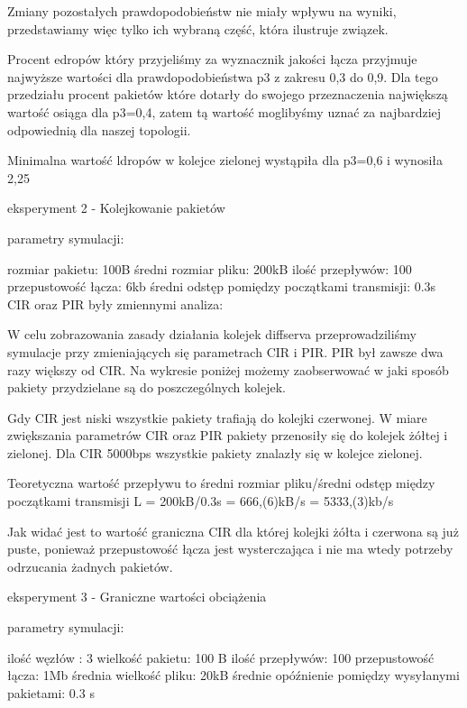 \documentclass[a4paper]{article}
\begin{document}
Zmiany pozostałych prawdopodobieństw nie miały wpływu na wyniki, przedstawiamy więc tylko ich wybraną część, która ilustruje związek.





Procent edropów który przyjeliśmy za wyznacznik jakości łącza przyjmuje najwyższe wartości dla prawdopodobieństwa p3 z zakresu 0,3 do 0,9. Dla tego przedziału procent pakietów które dotarły do swojego przeznaczenia największą wartość osiąga dla p3=0,4, zatem tą wartość moglibyśmy uznać za najbardziej odpowiednią dla naszej topologii. 

Minimalna wartość ldropów w kolejce zielonej wystąpiła dla p3=0,6 i wynosiła 2,25%

eksperyment 2 - Kolejkowanie pakietów

parametry symulacji:

rozmiar pakietu: 100B
średni rozmiar pliku: 200kB
ilość przepływów: 100
przepustowość łącza: 6kb
średni odstęp pomiędzy początkami transmisji: 0.3s
CIR oraz PIR były zmiennymi
analiza:

W celu zobrazowania zasady działania kolejek diffserva przeprowadziliśmy symulacje przy zmieniających się parametrach CIR i PIR. PIR był zawsze dwa razy większy od CIR.
Na wykresie poniżej możemy zaobserwować w jaki sposób pakiety przydzielane są do poszczególnych kolejek.






Gdy CIR jest niski wszystkie pakiety trafiają do kolejki czerwonej. W miare zwiększania parametrów CIR oraz PIR pakiety przenosiły się do kolejek żółtej i zielonej. Dla CIR 5000bps wszystkie pakiety znalazły się w kolejce zielonej.

Teoretyczna wartość przepływu to średni rozmiar pliku/średni odstęp między początkami transmisji
L = 200kB/0.3s = 666,(6)kB/s = 5333,(3)kb/s

Jak widać jest to wartość graniczna CIR dla której kolejki żółta i czerwona są już puste, ponieważ przepustowość łącza jest wysterczająca i nie ma wtedy potrzeby odrzucania żadnych pakietów.

eksperyment 3 - Graniczne wartości obciążenia


parametry symulacji:

 
ilość węzłów : 3
wielkość pakietu: 100 B
ilość przepływów: 100
przepustowość łącza: 1Mb
średnia wielkość pliku: 20kB
średnie opóźnienie pomiędzy wysyłanymi pakietami: 0.3 s
\end{document}
